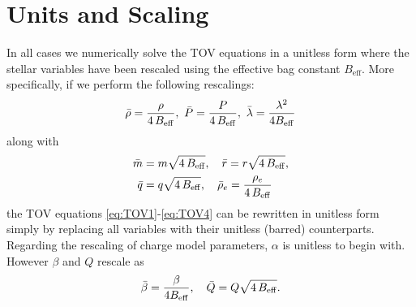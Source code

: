 \documentclass[12pt,noshowpacs,nofootinbib,notitlepage,amsmath,superscriptaddress]{revtex4-1}%
\begin{document}


\cleardoublepage
{}  
\renewcommand*{\refname}{References}




\appendix
\section{Units and Scaling}\label{sec:appendix}
In all cases we numerically solve the TOV equations in a unitless form where the stellar variables have been rescaled using the effective bag constant $B_\mathrm{eff}$. More specifically, if we perform the following rescalings:
\begin{equation}
    \bar{\rho}=\frac{\rho}{4\,B_{\rm eff}}, \,\, \bar{P}=\frac{P}{4\,B_{\rm eff}}, \,\,\bar{\lambda}=\frac{\lambda^2}{4B_{\rm eff}}
\end{equation}
along with
\begin{align}
\bar{m}&=m{\sqrt{4\,B_{\rm eff}}}, \quad \bar{r}={r}{\sqrt{4\,B_{\rm eff}}},\\
\bar{q}&={q}{\sqrt{4\,B_{\rm eff}}}, \quad \bar{\rho}_e=\frac{\rho_e}{4\,B_{\rm eff}}
\end{align}
the TOV equations \eqref{eq:TOV1}-\eqref{eq:TOV4} can be rewritten in unitless form simply by replacing all variables with their unitless (barred) counterparts. Regarding the rescaling of charge model parameters, $\alpha$ is unitless to begin with. However $\beta$ and $Q$ rescale as
\begin{equation}
    \bar{\beta}=\frac{\beta}{4B_{\rm eff}}, \quad \bar{Q}={Q}{\sqrt{4\,B_{\rm eff}}}.
\end{equation}
\end{document}
